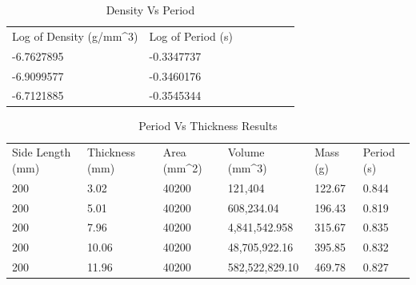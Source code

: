 \documentclass[12pt]{article}
\begin{document}
\begin{multicols}{2}
\begin{table}[H]
\centering
\caption{Density Vs Period}
\label{Density Vs Period}
\begin{tabular}{lllllll}
Log of Density (g/mm\textasciicircum 3) & Log of Period (s) \\
-6.7627895  & -0.3347737      \\
-6.9099577  & -0.3460176      \\
-6.7121885  & -0.3545344     
\end{tabular}
\end{table}

\end{multicols}

\pagebreak

\begin{table}[H]
\centering
\caption{Period Vs Thickness Results}
\label{Period Vs Thickness Results}
\begin{tabular}{llllll}
Side Length (mm) & Thickness (mm) & Area (mm\textasciicircum 2) & Volume (mm\textasciicircum 3) & Mass (g) & Period (s) \\
200              & 3.02           & 40200                       & 121,404                       & 122.67   & 0.844      \\
200              & 5.01           & 40200                       & 608,234.04                    & 196.43   & 0.819      \\
200              & 7.96           & 40200                       & 4,841,542.958                 & 315.67   & 0.835      \\
200              & 10.06          & 40200                       & 48,705,922.16                 & 395.85   & 0.832      \\
200              & 11.96          & 40200                       & 582,522,829.10                & 469.78   & 0.827     
\end{tabular}
\end{table} 
\end{document}
